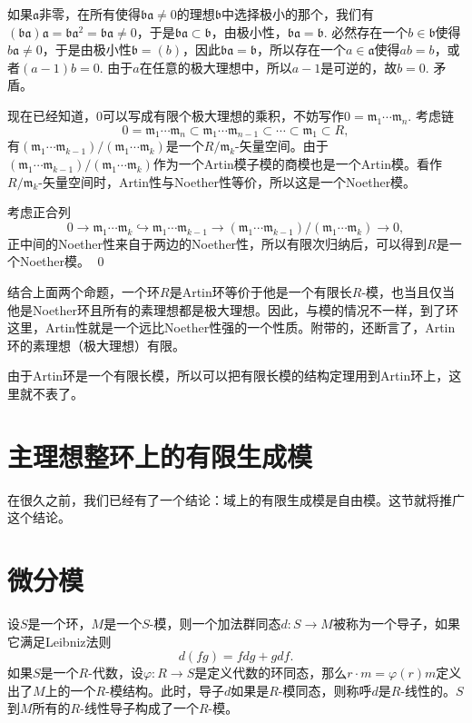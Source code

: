 	如果$\mathfrak{a}$非零，在所有使得$\mathfrak{b}\mathfrak{a}\neq 0$的理想$\mathfrak{b}$中选择极小的那个，我们有$(\mathfrak{b}\mathfrak{a})\mathfrak{a}=\mathfrak{b}\mathfrak{a}^2=\mathfrak{b}\mathfrak{a}\neq 0$，于是$\mathfrak{b}\mathfrak{a}\subset \mathfrak{b}$，由极小性，$\mathfrak{b}\mathfrak{a}=\mathfrak{b}$. 必然存在一个$b\in\mathfrak{b}$使得$b\mathfrak{a}\neq 0$，于是由极小性$\mathfrak{b}=(b)$，因此$\mathfrak{b}\mathfrak{a}=\mathfrak{b}$，所以存在一个$a\in \mathfrak{a}$使得$ab=b$，或者$(a-1)b=0$. 由于$a$在任意的极大理想中，所以$a-1$是可逆的，故$b=0$. 矛盾。

	现在已经知道，$0$可以写成有限个极大理想的乘积，不妨写作$0=\mathfrak{m}_1\cdots \mathfrak{m}_n$. 考虑链
	\[
	0=\mathfrak{m}_1\cdots \mathfrak{m}_n\subset \mathfrak{m}_1\cdots \mathfrak{m}_{n-1}\subset \cdots\subset \mathfrak{m}_1\subset R,
	\]
	有$(\mathfrak{m}_1\cdots \mathfrak{m}_{k-1})/(\mathfrak{m}_1\cdots \mathfrak{m}_{k})$是一个$R/\mathfrak{m}_{k}$-矢量空间。由于$(\mathfrak{m}_1\cdots \mathfrak{m}_{k-1})/(\mathfrak{m}_1\cdots \mathfrak{m}_{k})$作为一个Artin模子模的商模也是一个Artin模。看作$R/\mathfrak{m}_{k}$-矢量空间时，Artin性与Noether性等价，所以这是一个Noether模。

	考虑正合列
	\[
	0\to \mathfrak{m}_1\cdots \mathfrak{m}_{k}\hookrightarrow\mathfrak{m}_1\cdots \mathfrak{m}_{k-1}\to (\mathfrak{m}_1\cdots \mathfrak{m}_{k-1})/(\mathfrak{m}_1\cdots \mathfrak{m}_{k})\to 0,
	\]
	正中间的Noether性来自于两边的Noether性，所以有限次归纳后，可以得到$R$是一个Noether模。
\qed

\para 结合上面两个命题，一个环$R$是Artin环等价于他是一个有限长$R$-模，也当且仅当他是Noether环且所有的素理想都是极大理想。因此，与模的情况不一样，到了环这里，Artin性就是一个远比Noether性强的一个性质。附带的，还断言了，Artin环的素理想（极大理想）有限。

由于Artin环是一个有限长模，所以可以把有限长模的结构定理用到Artin环上，这里就不表了。

\section{主理想整环上的有限生成模}

\para 在很久之前，我们已经有了一个结论：域上的有限生成模是自由模。这节就将推广这个结论。

\section{微分模}

\para 设$S$是一个环，$M$是一个$S$-模，则一个加法群同态$d:S\to M$被称为一个导子，如果它满足Leibniz法则
\[
	d(fg)=fdg+gdf.
\]
如果$S$是一个$R$-代数，设$\varphi:R\to S$是定义代数的环同态，那么$r\cdot m=\varphi(r)m$定义出了$M$上的一个$R$-模结构。此时，导子$d$如果是$R$-模同态，则称呼$d$是$R$-线性的。$S$到$M$所有的$R$-线性导子构成了一个$R$-模。


